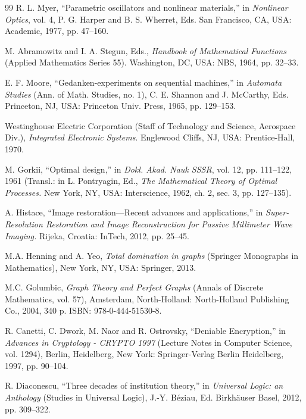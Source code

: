 \documentclass[11pt,a5paper,twoside]{article}
\begin{document}
\begin{thebibliography}{99}
 R. L. Myer, ``Parametric oscillators and nonlinear materials,'' in 
\textit{Nonlinear Optics}, vol. 4, P. G. Harper and B. S. Wherret, Eds. San Francisco, CA, USA: Academic, 1977, pp. 47--160. 

 M. Abramowitz and I. A. Stegun, Eds., \textit{Handbook of Mathematical Functions }(Applied Mathematics Series 55). 
Washington, DC, USA: NBS, 1964, pp. 32--33. 

 E. F. Moore, ``Gedanken-experiments on sequential machines,'' in 
\textit{Automata Studies }(Ann. of Math. Studies, no. 1), C. E. Shannon and J. McCarthy, Eds. Princeton, NJ, USA: Princeton Univ. Press, 1965, pp. 129--153. 

 Westinghouse Electric Corporation (Staff of Technology and Science, Aerospace Div.), \textit{Integrated Electronic Systems}. Englewood Cliffs, NJ, USA: Prentice-Hall, 1970. 

 M. Gorkii, ``Optimal design,'' in \textit{Dokl. Akad. Nauk SSSR}, vol. 12, pp. 111--122, 1961 (Transl.: in L. Pontryagin, Ed., \textit{The Mathematical Theory of Optimal Processes. }New York, NY, USA: Interscience, 1962, ch. 2, sec. 3, pp. 127--135). 

 A. Histace, ``Image restoration---Recent advances and applications,'' in \textit{Super-Resolution Restoration and Image Reconstruction for Passive Millimeter Wave Imaging. }Rijeka, Croatia: InTech, 2012, pp. 25--45. 


 M.A. Henning and A. Yeo, \textit{Total domination in graphs} (Springer Monographs in Mathematics), New York, NY, USA: Springer, 2013.

 M.C. Golumbic, \textit{Graph Theory and Perfect Graphs }(Annals of Discrete Mathematics, vol. 57), Amsterdam, North-Holland: North-Holland Publishing Co., 2004, 340 p. ISBN: 978-0-444-51530-8. 

 R. Canetti, C. Dwork, M. Naor and R. Ostrovsky, ``Deniable 
Encryption,'' in \textit{Advances in Cryptology - CRYPTO 1997 }(Lecture Notes in Computer Science, vol. 1294), Berlin, Heidelberg, New York: Springer-Verlag Berlin Heidelberg, 1997, pp. 90--104.

 R. Diaconescu, ``Three decades of institution theory,'' in \textit{Universal Logic: an Anthology} (Studies in Universal Logic), J.-Y. B\'{e}ziau, Ed. Birkh\"{a}user Basel, 2012, pp. 309--322. 


\end{thebibliography}
\end{document}
